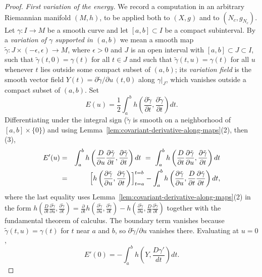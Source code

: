 \begin{proof}
\emph{First variation of the energy.} We record a computation in an
arbitrary Riemannian manifold $(M,h)$, to be applied both to $(X,g)$
and to $(N_c,g_{N_c})$. Let $\gamma\colon I\to M$ be a smooth curve and
let $[a,b]\subset I$ be a compact subinterval. By a {\em variation of
$\gamma$ supported in $(a,b)$} we mean a smooth map
$\tilde\gamma\colon J\times(-\epsilon,\epsilon)\to M$, where
$\epsilon>0$ and $J$ is an open interval with $[a,b]\subset J\subset
I$, such that $\tilde\gamma(t,0)=\gamma(t)$ for all $t\in J$ and such
that $\tilde\gamma(t,u)=\gamma(t)$ for all $u$ whenever $t$ lies
outside some compact subset of $(a,b)$; its {\em variation field} is
the smooth vector field $Y(t)=\partial\tilde\gamma/\partial u\,(t,0)$
along $\gamma|_J$, which vanishes outside a compact subset of $(a,b)$.
Set
$$E(u)=\frac12\int_a^b
h\left(\frac{\partial\tilde\gamma}{\partial t},
\frac{\partial\tilde\gamma}{\partial t}\right)dt .$$
Differentiating under the integral sign ($\tilde\gamma$ is smooth on a
neighborhood of $[a,b]\times\{0\}$) and using
Lemma~\ref{lem:covariant-derivative-along-maps}(2), then (3),
\begin{eqnarray*}
E'(u) & = & \int_a^bh\left(\frac{D}{\partial u}
\frac{\partial\tilde\gamma}{\partial t},
\frac{\partial\tilde\gamma}{\partial t}\right)dt
\ =\ \int_a^bh\left(\frac{D}{\partial t}
\frac{\partial\tilde\gamma}{\partial u},
\frac{\partial\tilde\gamma}{\partial t}\right)dt\\
& = & \Bigl[h\left(\frac{\partial\tilde\gamma}{\partial u},
\frac{\partial\tilde\gamma}{\partial t}\right)\Bigr]_{t=a}^{t=b}
-\int_a^bh\left(\frac{\partial\tilde\gamma}{\partial u},
\frac{D}{\partial t}\frac{\partial\tilde\gamma}{\partial t}\right)dt ,
\end{eqnarray*}
where the last equality uses
Lemma~\ref{lem:covariant-derivative-along-maps}(2) in the form
$h\left(\frac{D}{\partial t}\frac{\partial\tilde\gamma}{\partial
u},\frac{\partial\tilde\gamma}{\partial t}\right)
=\frac{\partial}{\partial t}
h\left(\frac{\partial\tilde\gamma}{\partial u},
\frac{\partial\tilde\gamma}{\partial t}\right)
-h\left(\frac{\partial\tilde\gamma}{\partial u},
\frac{D}{\partial t}\frac{\partial\tilde\gamma}{\partial t}\right)$
together with the fundamental theorem of calculus. The boundary term
vanishes because $\tilde\gamma(t,u)=\gamma(t)$ for $t$ near $a$ and
$b$, so $\partial\tilde\gamma/\partial u$ vanishes there. Evaluating at
$u=0$,
\begin{equation}\label{eq:first-variation-energy}
E'(0)=-\int_a^bh\left(Y,\frac{D\gamma'}{dt}\right)dt .
\end{equation}


\end{proof}
